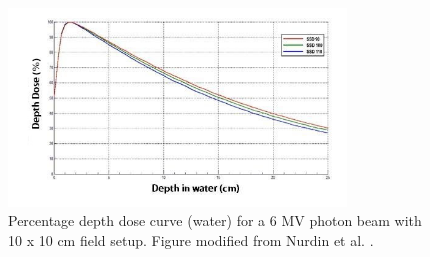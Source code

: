 \begin{figure}[h]
	\begin{center}
		\includegraphics[width=0.8\textwidth]{figures/pdd}
		\caption{Percentage depth dose curve (water) for a 6 MV photon beam with 10
      x 10 cm field setup. Figure modified from Nurdin et al. \cite{Nurdin}.}
		\label{fig:pdd}
	\end{center}
\end{figure}
